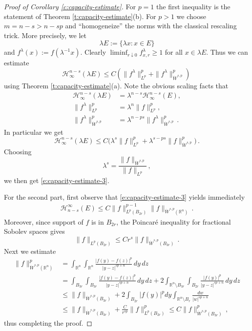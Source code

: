 \documentclass[11pt,reqno]{amsart}
\theoremstyle{definition}
\numberwithin{equation}{section}
\begin{document}
\begin{proof}[Proof of Corollary \ref{c:capacity-estimate}]
For $p=1$ the first inequality is the statement of Theorem \ref{t:capacity-estimate}(b). For $p>1$ we choose $m=n-s>n-sp$ and ``homogeneize'' the norms with the classical rescaling trick. More precisely, we let 
\[
\lambda E := \{\lambda x: x\in E\}
\]
and $f^\lambda (x) := f (\lambda^{-1} x)$. Clearly $\liminf_{r\downarrow 0} f^\lambda_{x,r} \geq 1$ for all $x\in \lambda E$. Thus we can estimate
\[
\mathcal{H}_\infty^{n-s} (\lambda E) \leq 
C (\|f^\lambda\|_{L^p}^p + \|f^\lambda\|_{\dot{W}^{s,p}}^p)\, 
\]
using Theorem \ref{t:capacity-estimate}(a).
Note the obvious scaling facts that 
\begin{align*}
\mathcal{H}_\infty^{n-s} (\lambda E) &= \lambda^{n-s}\mathcal{H}_\infty^{n-s} (E),\\
\|f^\lambda\|^p_{L^p} & = \lambda^n \|f\|^p_{L^p},\\
\|f^\lambda\|^p_{\dot{W}^{s,p}}&= \lambda^{n-ps}\|f^\lambda\|^p_{\dot{W}^{s,p}}\, .
\end{align*}
In particular we get 
\[
\mathcal{H}_\infty^{n-s} (\lambda E) \leq C \bigl(\lambda^s\|f\|^p_{L^p}
+ \lambda^{s-ps} \|f\|_{\dot{W}^{s,p}}^p)\, .
\]
Choosing 
\[
\lambda^s= \frac{\|f\|_{\dot{W}^{s,p}}}{\|f\|_{L^p}}\, ,
\]
we then get \eqref{e:capacity-estimate-3}. 

For the second part, first observe that \eqref{e:capacity-estimate-3} yields immediately
\begin{align*}
\mathcal{H}^\infty_{n-s} (E) \leq C \|f\|_{L^p (B_{2r})}^{p-1} \|f\|_{\dot{W}^{s,p} (\mathbb R^n)}\, .
\end{align*}
Moreover, since support of $f$ is in $B_{2r}$, the Poincar\'e inequality for fractional Sobolev spaces gives 
\[
\|f\|_{L^p (B_{2r})} \leq C r^s \|f\|_{\dot{W}^{s,p} (B_{3r})}\, .
\]
Next we estimate
\begin{align*}
\|f\|_{\dot{W}^{s,p} (\mathbb R^n)}^p
&= \int_{\mathbb R^n}\int_{\mathbb R^n} \frac{|f(y)-f(z)|^p}{|y-z|^{sp+n}}\,dy\,dz\\
&= \int_{B_{3r}} \int_{B_{3r}} \frac{|f(y)-f(z)|^p}{|y-z|^{sp+n}}\, dy\,dz + 2 \int_{\mathbb R^n\setminus B_{3r}} \int_{B_{2r}} \frac{|f(y)|^p}{|y-z|^{sp+n}}\, dy\,dz\\
& \leq \|f\|_{\dot{W}^{s,p} (B_{3r})} + 2 \int_{B_{2r}} |f(y)|^p dy \int_{\mathbb R^n \setminus B_r} \frac{dw}{|w|^{sp+n}}\\
& \leq \|f\|_{\dot{W}^{s,p} (B_{3r})} + \frac{C}{r^{sp}} \|f\|_{L^p (B_{2r})}^p 
\leq C \|f\|_{\dot{W}^{s,p} (B_{3r})}^p\, ,
\end{align*}
thus completing the proof.
\end{proof}
\end{document}
